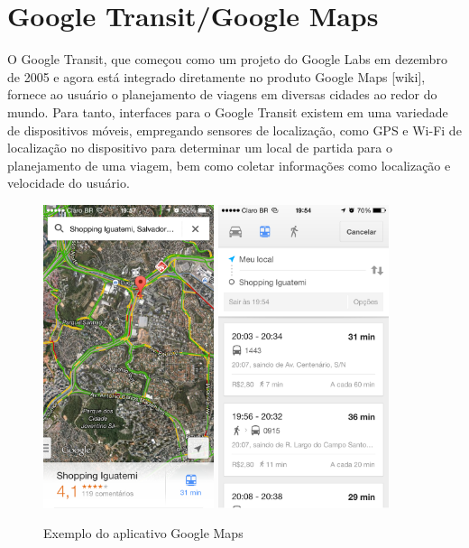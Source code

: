 \section{Google Transit/Google Maps}

O Google Transit, que começou como um projeto do Google Labs em dezembro de 2005 e agora está integrado diretamente no produto Google Maps [wiki],  fornece ao usuário o planejamento de viagens em diversas cidades ao redor do mundo. Para tanto, interfaces para o Google Transit existem em uma variedade de dispositivos móveis, empregando sensores de localização, como GPS e Wi-Fi de localização no dispositivo para determinar um local de partida para o planejamento de uma viagem, bem como coletar informações como localização e velocidade do usuário. 	

\begin{figure}[htp]
\begin{center}
  \includegraphics[width=5cm]{images/maps2.png}
    \includegraphics[width=5cm]{images/maps3.png}
  \caption{Exemplo do aplicativo Google Maps}
  \label{fig:exampleMaps}
\end{center}
\end{figure}


